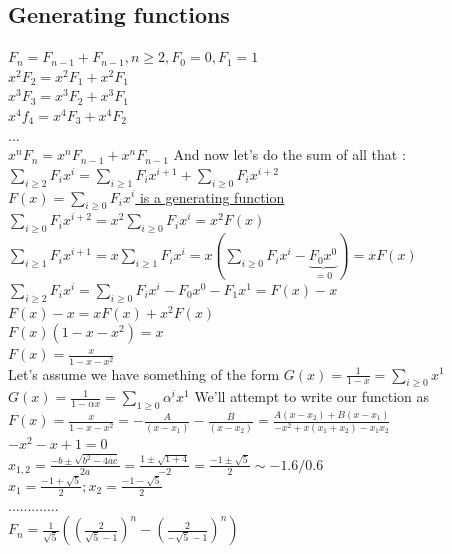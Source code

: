 \documentclass[12pt,a4paper]{article}
\begin{document}
\subsection{Generating functions}
$F_n = F_{n-1}+F_{n-1}, n \geq 2, F_0 = 0, F_1 = 1$\\
$x^2F_2 = x^2F_1 + x^2F_1$\\
$x^3F_3 = x^3F_2 + x^3F_1$\\
$x^4f_4 = x^4F_3 + x^4F_2$\\
...\\
$x^nF_n = x^nF_{n-1}+x^nF_{n-1}$ And now let's do the sum of all that :\\
$\sum\limits_{i\geq 2} F_ix^i = \sum\limits_{i \geq 1}F_ix^{i+1} + \sum\limits_{i \geq 0}F_ix^{i+2} $\\
\underline{$F(x) = \sum\limits_{i \geq 0}F_ix^i$ is a generating function}\\
$\sum\limits_{i\geq 0}F_ix^{i+2} = x^2\sum\limits_{i\geq 0}F_ix^i = x^2F(x)$\\
$\sum\limits_{i\geq 1}F_ix^{i+1} = x\sum\limits_{i\geq 1}F_ix^i = x\left(\sum\limits_{i\geq 0}F_ix^i-\underbrace{F_0x^0}_{=0}\right) = xF(x)$\\
$\sum\limits_{i\geq 2}F_ix^i = \sum\limits_{i\geq 0}F_ix^i-F_0x^0-F_1x^1 = F(x) - x$\\
$F(x) - x = xF(x) + x^2F(x)$\\
$F(x)\left(1-x-x^2\right) = x$\\
$F(x) = \frac{x}{1-x-x^2}$\\
Let's assume we have something of the form $G(x) = \frac{1}{1-x} = \sum\limits_{i\geq 0} x^1$\\
$G(x) = \frac{1}{1-\alpha x} = \sum\limits_{1 \geq 0} \alpha^ix^1$
We'll attempt to write our function as $F(x) = \frac{x}{1-x-x^2} = -\frac{A}{(x-x_1)} - \frac{B}{(x-x_2)} = \frac{A(x-x_2)+B(x-x_1)}{-x^2+x(x_1+x_2) - x_1x_2}$\\
$-x^2-x+1 = 0$\\
$x_{1,2} = \frac{-b\pm\sqrt{b^2-4ac}}{2a} = \frac{1\pm\sqrt{1+4}}{-2} = \frac{-1\pm\sqrt{5}}{2} \sim -1.6 / 0.6$\\
$x_1 = \frac{-1+\sqrt{5}}{2} ; x_2 = \frac{-1-\sqrt{5}}{2}$\\
.............\\
$F_n = \frac{1}{\sqrt{5}}\left(\left(\frac{2}{\sqrt{5}-1}\right)^n - \left(\frac{2}{-\sqrt{5}-1}\right)^n\right)$
\end{document}
